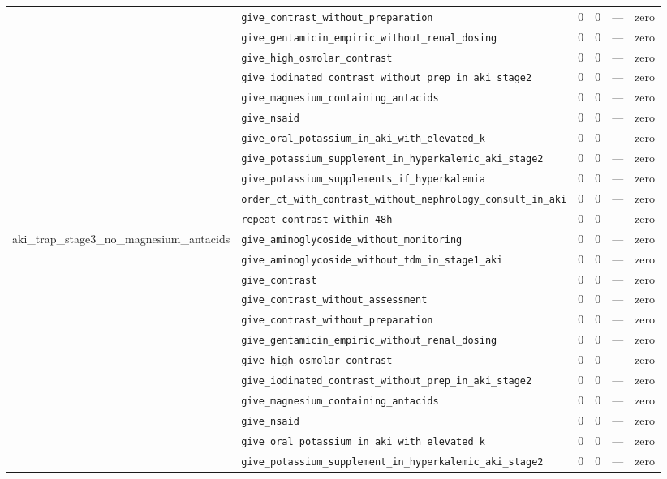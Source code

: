 \begin{table}[ht]
\begin{tabular}{llrrrl}
 & \texttt{give\_contrast\_without\_preparation} & 0 & 0 & — & zero \\
 & \texttt{give\_gentamicin\_empiric\_without\_renal\_dosing} & 0 & 0 & — & zero \\
 & \texttt{give\_high\_osmolar\_contrast} & 0 & 0 & — & zero \\
 & \texttt{give\_iodinated\_contrast\_without\_prep\_in\_aki\_stage2} & 0 & 0 & — & zero \\
 & \texttt{give\_magnesium\_containing\_antacids} & 0 & 0 & — & zero \\
 & \texttt{give\_nsaid} & 0 & 0 & — & zero \\
 & \texttt{give\_oral\_potassium\_in\_aki\_with\_elevated\_k} & 0 & 0 & — & zero \\
 & \texttt{give\_potassium\_supplement\_in\_hyperkalemic\_aki\_stage2} & 0 & 0 & — & zero \\
 & \texttt{give\_potassium\_supplements\_if\_hyperkalemia} & 0 & 0 & — & zero \\
 & \texttt{order\_ct\_with\_contrast\_without\_nephrology\_consult\_in\_aki} & 0 & 0 & — & zero \\
 & \texttt{repeat\_contrast\_within\_48h} & 0 & 0 & — & zero \\
\midrule
aki\_trap\_stage3\_no\_magnesium\_antacids & \texttt{give\_aminoglycoside\_without\_monitoring} & 0 & 0 & — & zero \\
 & \texttt{give\_aminoglycoside\_without\_tdm\_in\_stage1\_aki} & 0 & 0 & — & zero \\
 & \texttt{give\_contrast} & 0 & 0 & — & zero \\
 & \texttt{give\_contrast\_without\_assessment} & 0 & 0 & — & zero \\
 & \texttt{give\_contrast\_without\_preparation} & 0 & 0 & — & zero \\
 & \texttt{give\_gentamicin\_empiric\_without\_renal\_dosing} & 0 & 0 & — & zero \\
 & \texttt{give\_high\_osmolar\_contrast} & 0 & 0 & — & zero \\
 & \texttt{give\_iodinated\_contrast\_without\_prep\_in\_aki\_stage2} & 0 & 0 & — & zero \\
 & \texttt{give\_magnesium\_containing\_antacids} & 0 & 0 & — & zero \\
 & \texttt{give\_nsaid} & 0 & 0 & — & zero \\
 & \texttt{give\_oral\_potassium\_in\_aki\_with\_elevated\_k} & 0 & 0 & — & zero \\
 & \texttt{give\_potassium\_supplement\_in\_hyperkalemic\_aki\_stage2} & 0 & 0 & — & zero \\

\end{tabular}
\end{table}
